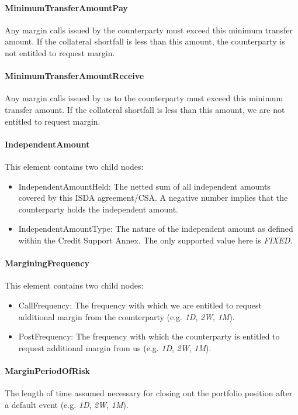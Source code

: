 \paragraph{MinimumTransferAmountPay} Any margin calls issued by the
counterparty must exceed this minimum transfer amount. If the
collateral shortfall is less than this amount, the counterparty is not
entitled to request margin.

\paragraph{MinimumTransferAmountReceive} Any margin calls issued by us
to the counterparty must exceed this minimum transfer amount. If the
collateral shortfall is less than this amount, we are  not
entitled to request margin.

\paragraph{IndependentAmount} This element contains two child nodes:
\begin{itemize}
\item IndependentAmountHeld: The netted sum of all independent amounts
  covered by this ISDA agreement/CSA. A negative number implies that
  the counterparty holds the independent amount.
\item IndependentAmountType: The nature of the independent amount as
  defined within the Credit Support Annex. The only supported value
  here is \emph{FIXED}. 
\end{itemize}

\paragraph{MarginingFrequency} This element contains two child nodes:
\begin{itemize}
\item CallFrequency: The frequency with which we are entitled to
  request additional margin from the counterparty (e.g. \emph{1D},
  \emph{2W}, \emph{1M}).
\item PostFrequency: The frequency with which the counterparty is entitled to
  request additional margin from us (e.g. \emph{1D},
  \emph{2W}, \emph{1M}).
\end{itemize}

\paragraph{MarginPeriodOfRisk} The length of time assumed necessary
for closing out the portfolio position after a default event  (e.g. \emph{1D},
  \emph{2W}, \emph{1M}).

